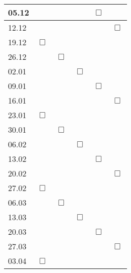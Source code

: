 \documentclass{article}
\begin{document}
\begin{table}[!ht]
\begin{tabular}{l|l|l|l|l|l}
      \\\midrule
      05.12 &             &             &             & { \large $ \Box $ } &            
      \\\midrule
      12.12 &             &             &             &             & { \large $ \Box $ }
      \\\midrule
      19.12 & { \large $ \Box $ } &             &             &             &            
      \\\midrule
      26.12 &             & { \large $ \Box $ } &             &             &            
      \\\midrule
      02.01 &             &             & { \large $ \Box $ } &             &            
      \\\midrule
      09.01 &             &             &             & { \large $ \Box $ } &            
      \\\midrule
      16.01 &             &             &             &             & { \large $ \Box $ }
      \\\midrule
      23.01 & { \large $ \Box $ } &             &             &             &            
      \\\midrule
      30.01 &             & { \large $ \Box $ } &             &             &            
      \\\midrule
      06.02 &             &             & { \large $ \Box $ } &             &            
      \\\midrule
      13.02 &             &             &             & { \large $ \Box $ } &            
      \\\midrule
      20.02 &             &             &             &             & { \large $ \Box $ }
      \\\midrule
      27.02 & { \large $ \Box $ } &             &             &             &            
      \\\midrule
      06.03 &             & { \large $ \Box $ } &             &             &            
      \\\midrule
      13.03 &             &             & { \large $ \Box $ } &             &            
      \\\midrule
      20.03 &             &             &             & { \large $ \Box $ } &            
      \\\midrule
      27.03 &             &             &             &             & { \large $ \Box $ }
      \\\midrule
      03.04 & { \large $ \Box $ } &             &             &             &            

\end{tabular}
\end{table}
\end{document}

